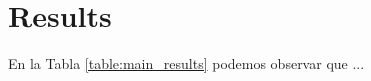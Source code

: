 \section{Results}
\label{section:results}



En la Tabla \ref{table:main_results} podemos observar que ...

